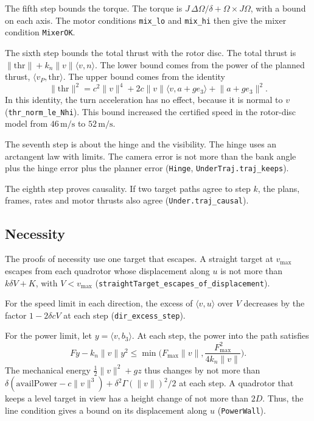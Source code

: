 \documentclass[11pt]{article}
\theoremstyle{definition}
\newcommand{\ip}[2]{\langle #1,#2\rangle}
\newcommand{\norm}[1]{\lVert #1\rVert}
\newcommand{\lean}[1]{\texttt{\small #1}}
\newcommand{\ms}{\,\mathrm{m/s}}
\begin{document}
The fifth step bounds the torque.
The torque is $J\,\Delta\Omega/\delta + \Omega \times J\Omega$, with a bound on each axis.
The motor conditions \lean{mix\_lo} and \lean{mix\_hi} then give the mixer condition
\lean{MixerOK}.

The sixth step bounds the total thrust with the rotor disc.
The total thrust is $\norm{\mathrm{thr}} + k_n\norm{v}\ip{v}{n}$.
The lower bound comes from the power of the planned thrust, $\ip{v_P}{\mathrm{thr}}$.
The upper bound comes from the identity
\begin{equation}
  \norm{\mathrm{thr}}^2 = c^2\norm{v}^4 + 2c\norm{v}\ip{v}{a + g e_3} + \norm{a + g e_3}^2 .
\end{equation}
In this identity, the turn acceleration has no effect, because it is normal to $v$
(\lean{thr\_norm\_le\_Nhi}).
This bound increased the certified speed in the rotor-disc model from $46\ms$ to $52\ms$.

The seventh step is about the hinge and the visibility.
The hinge uses an arctangent law with limits.
The camera error is not more than the bank angle plus the hinge error plus the planner error
(\lean{Hinge}, \lean{UnderTraj.traj\_keeps}).

The eighth step proves causality.
If two target paths agree to step $k$, the plans, frames, rates and motor thrusts also agree
(\lean{Under.traj\_causal}).

\subsection{Necessity}

The proofs of necessity use one target that escapes.
A straight target at $v_{\max}$ escapes from each quadrotor whose displacement along $u$ is not more
than $k\delta V + K$, with $V < v_{\max}$ (\lean{straightTarget\_escapes\_of\_displacement}).

For the speed limit in each direction, the excess of $\ip{v}{u}$ over $V$ decreases by the factor
$1 - 2\delta c V$ at each step (\lean{dir\_excess\_step}).

For the power limit, let $y = \ip{v}{b_3}$.
At each step, the power into the path satisfies
\begin{equation}
  F y - k_n\norm{v} y^2 \le \min\!\Big(F_{\max}\norm v, \frac{F_{\max}^2}{4k_n\norm v}\Big).
\end{equation}
The mechanical energy $\tfrac12\norm{v}^2 + g z$ thus changes by not more than
$\delta(\mathrm{availPower} - c\norm v^3) + \delta^2 \Gamma(\norm v)^2/2$ at each step.
A quadrotor that keeps a level target in view has a height change of not more than $2D$.
Thus, the line condition gives a bound on its displacement along $u$ (\lean{PowerWall}).
\end{document}
